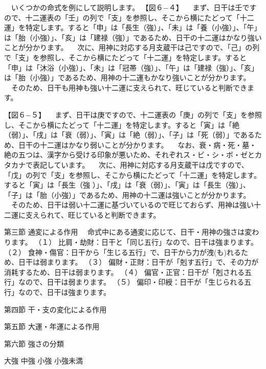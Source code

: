\documentclass[a5paper,11pt,dvipdfmx]{tarticle}
\begin{document}
　いくつかの命式を例にして説明します。
【図６−４】
　まず、日干は壬ですので、十二運表の「壬」の列で「支」を参照し、そこから横にたどって「十二運」を特定します。すると「申」は「長生（強）」、「未」は「養（小強）」、「午」は「胎（小強）」、「亥」は「建禄（強）」であるため、日干の十二運はかなり強いことが分かります。
　次に、用神に対応する月支蔵干は己ですので、「己」の列で「支」を参照し、そこから横にたどって「十二運」を特定します。すると「申」は「沐浴（小強）」、「未」は「冠帯（強）」、「午」は「建禄（強）」、「亥」は「胎（小強）」であるため、用神の十二運もかなり強いことが分かります。
　そのため、日干も用神も強い十二運に支えられて、旺じていると判断できます。

【図６−５】
　まず、日干は庚ですので、十二運表の「庚」の列で「支」を参照し、そこから横にたどって「十二運」を特定します。すると「寅」は「絶（弱）」、「戌」は「衰（弱）」、「寅」は「絶（弱）」、「子」は「死（弱）」であるため、日干の十二運はかなり弱いことが分かります。
　なお、衰・病・死・墓・絶の五つは、漢字から受ける印象が悪いため、それぞれス・ビ・シ・ボ・ゼとカタカナで表記しています。
　次に、用神に対応する月支蔵干は戊ですので、「戊」の列で「支」を参照し、そこから横にたどって「十二運」を特定します。すると「寅」は「長生（強
）」、「戌」は「衰（弱）」、「寅」は「長生（強）」、「子」は「胎（小強）」であるため、用神の十二運は強いことが分かります。
　そのため、日干は弱い十二運に基づいているので旺じておらず、用神は強い十二運に支えられて、旺じていると判断できます。

第三節	通変による作用
　命式中にある通変に応じて、日干・用神の強さは変わります。
（１）	比肩・劫財：日干と「同じ五行」なので、日干は強まります。
（２）	食神・傷官：日干から「生じる五行」で、日干から力が洩(も)れるため、日干は弱まります。
（３）	偏財・正財：日干が「剋す五行」で、その力が消耗するため、日干は弱まります。
（４）	偏官・正官：日干が「剋される五行」なので、日干は弱まります。
（５）	偏印・印綬：日干が「生じられる五行」なので、日干は強まります。



第四節	干・支の変化による作用


第五節	大運・年運による作用



第六節	強さの分類

大強
中強
小強
小強未満
\end{document}
